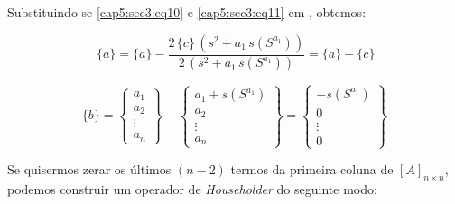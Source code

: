 Substituindo-se \ref{cap5:sec3:eq10} e \ref{cap5:sec3:eq11} em \label{cap5:sec3:eq9}, obtemos:

\begin{equation}
 [P] \, \{a\} = \{a\} - \frac{2 \, \{c\} \, (s^2 + a_1 \, s(S^{a_1}))}{2 \, (s^2 + a_1 \, s(S^{a_1}))} = \{a\} - \{c\}
\end{equation}

\begin{equation}
 \{b\} =
 \left\{
 \begin{array}{c}
  a_1\\
  a_2\\
  \vdots\\
  a_n
 \end{array}
 \right\}
 -
 \left\{
 \begin{array}{c}
  a_1 + s(S^{a_1})\\
  a_2\\
  \vdots\\
  a_n
 \end{array}
 \right\}
 =
 \left\{
 \begin{array}{c}
  -s(S^{a_1})\\
  0\\
  \vdots\\
  0
 \end{array}
 \right\}
\end{equation}

Se quisermos zerar os últimos $ (n-2) $ termos da primeira coluna de $ [A]_{n \times n} $, podemos construir um operador de \textit{Householder} do seguinte modo:


